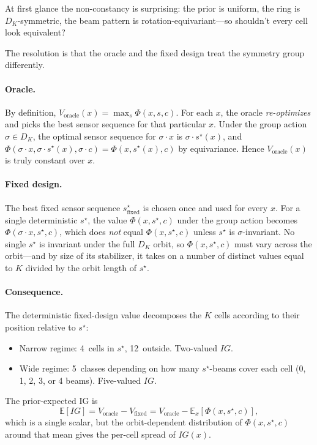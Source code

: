 \documentclass[11pt,a4paper]{article}
\newcommand{\E}{\mathbb{E}}
\begin{document}
At first glance the non-constancy is surprising: the prior is uniform, the ring is $D_K$-symmetric, the beam pattern is rotation-equivariant---so shouldn't every cell look equivalent?

The resolution is that the oracle and the fixed design treat the symmetry group differently.

\paragraph{Oracle.}  By definition, $V_{\text{oracle}}(x) = \max_{s} \Phi(x, s, c)$.  For each $x$, the oracle \emph{re-optimizes} and picks the best sensor sequence for that particular $x$.  Under the group action $\sigma \in D_K$, the optimal sensor sequence for $\sigma \cdot x$ is $\sigma \cdot s^\star(x)$, and $\Phi(\sigma \cdot x, \sigma \cdot s^\star(x), \sigma \cdot c) = \Phi(x, s^\star(x), c)$ by equivariance.  Hence $V_{\text{oracle}}(x)$ is truly constant over $x$.

\paragraph{Fixed design.}  The best fixed sensor sequence $s^\star_{\text{fixed}}$ is chosen once and used for every $x$.  For a single deterministic $s^\star$, the value $\Phi(x, s^\star, c)$ under the group action becomes $\Phi(\sigma \cdot x, s^\star, c)$, which does \emph{not} equal $\Phi(x, s^\star, c)$ unless $s^\star$ is $\sigma$-invariant.  No single $s^\star$ is invariant under the full $D_K$ orbit, so $\Phi(x, s^\star, c)$ must vary across the orbit---and by size of its stabilizer, it takes on a number of distinct values equal to $K$ divided by the orbit length of $s^\star$.

\paragraph{Consequence.}  The deterministic fixed-design value decomposes the $K$ cells according to their position relative to $s^\star$:
\begin{itemize}[nosep]
  \item Narrow regime: 4~cells in $s^\star$, 12~outside.  Two-valued $IG$.
  \item Wide regime: 5~classes depending on how many $s^\star$-beams cover each cell (0, 1, 2, 3, or 4 beams).  Five-valued $IG$.
\end{itemize}
The prior-expected IG is
\[
  \E[IG] = V_{\text{oracle}} - V_{\text{fixed}} = V_{\text{oracle}} - \E_x[\Phi(x, s^\star, c)],
\]
which is a single scalar, but the orbit-dependent distribution of $\Phi(x, s^\star, c)$ around that mean gives the per-cell spread of $IG(x)$.
\end{document}
